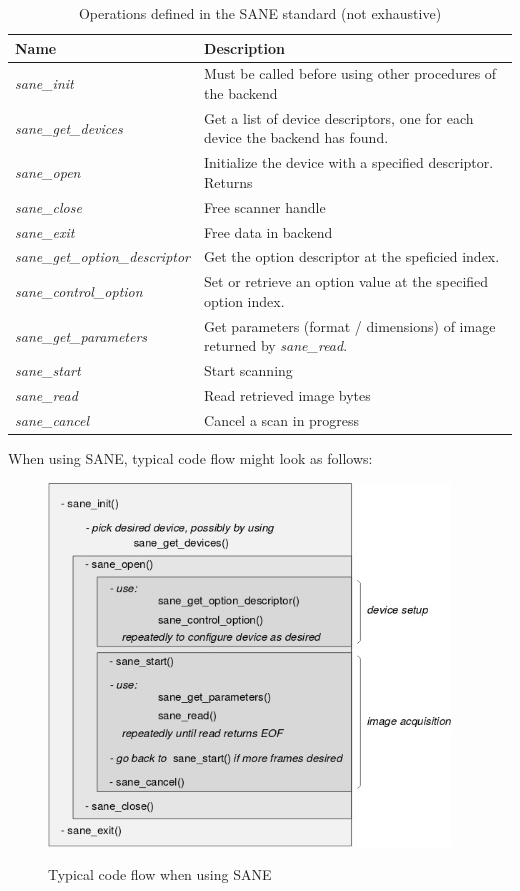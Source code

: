 \documentclass{article}
\begin{document}
\begin{table}[H]
  \caption{Operations defined in the SANE standard (not exhaustive)}
  \centering
  \begin{tabular}{l | p{8cm}}
    Name & Description \\ \hline
    \it sane\_init & Must be called before using other procedures of the backend \\
    \it sane\_get\_devices & Get a list of device descriptors, one for each device
                             the backend has found. \\
    \it sane\_open & Initialize the device with a specified descriptor. Returns \\
    \it sane\_close & Free scanner handle \\
    \it sane\_exit & Free data in backend \\
    \it sane\_get\_option\_descriptor & Get the option descriptor at the speficied index. \\
    \it sane\_control\_option & Set or retrieve an option value at the specified option index. \\
    \it sane\_get\_parameters & Get parameters (format / dimensions) of image returned by {\it sane\_read}. \\
    \it sane\_start & Start scanning \\
    \it sane\_read & Read retrieved image bytes \\
    \it sane\_cancel & Cancel a scan in progress \\
  \end{tabular}
\end{table}

\cite[4.3]{sane_standard}

When using SANE, typical code flow might look as follows:

\begin{figure}[H]
  \caption{Typical code flow when using SANE}
  \centering
  \includegraphics[width=0.95\textwidth]{images/sane_codeflow.jpg}
  \label{time_diagram}
\end{figure}
\end{document}
